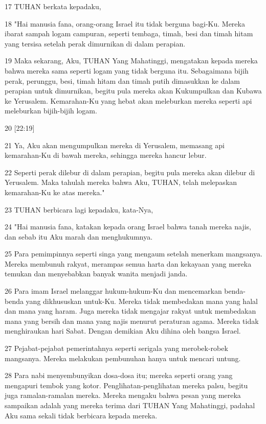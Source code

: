 \par 17 TUHAN berkata kepadaku,
\par 18 "Hai manusia fana, orang-orang Israel itu tidak berguna bagi-Ku. Mereka ibarat sampah logam campuran, seperti tembaga, timah, besi dan timah hitam yang tersisa setelah perak dimurnikan di dalam perapian.
\par 19 Maka sekarang, Aku, TUHAN Yang Mahatinggi, mengatakan kepada mereka bahwa mereka sama seperti logam yang tidak berguna itu. Sebagaimana bijih perak, perunggu, besi, timah hitam dan timah putih dimasukkan ke dalam perapian untuk dimurnikan, begitu pula mereka akan Kukumpulkan dan Kubawa ke Yerusalem. Kemarahan-Ku yang hebat akan meleburkan mereka seperti api meleburkan bijih-bijih logam.
\par 20 [22:19]
\par 21 Ya, Aku akan mengumpulkan mereka di Yerusalem, memasang api kemarahan-Ku di bawah mereka, sehingga mereka hancur lebur.
\par 22 Seperti perak dilebur di dalam perapian, begitu pula mereka akan dilebur di Yerusalem. Maka tahulah mereka bahwa Aku, TUHAN, telah melepaskan kemarahan-Ku ke atas mereka."
\par 23 TUHAN berbicara lagi kepadaku, kata-Nya,
\par 24 "Hai manusia fana, katakan kepada orang Israel bahwa tanah mereka najis, dan sebab itu Aku marah dan menghukumnya.
\par 25 Para pemimpinnya seperti singa yang mengaum setelah menerkam mangsanya. Mereka membunuh rakyat, merampas semua harta dan kekayaan yang mereka temukan dan menyebabkan banyak wanita menjadi janda.
\par 26 Para imam Israel melanggar hukum-hukum-Ku dan mencemarkan benda-benda yang dikhususkan untuk-Ku. Mereka tidak membedakan mana yang halal dan mana yang haram. Juga mereka tidak mengajar rakyat untuk membedakan mana yang bersih dan mana yang najis menurut peraturan agama. Mereka tidak menghiraukan hari Sabat. Dengan demikian Aku dihina oleh bangsa Israel.
\par 27 Pejabat-pejabat pemerintahnya seperti serigala yang merobek-robek mangsanya. Mereka melakukan pembunuhan hanya untuk mencari untung.
\par 28 Para nabi menyembunyikan dosa-dosa itu; mereka seperti orang yang mengapuri tembok yang kotor. Penglihatan-penglihatan mereka palsu, begitu juga ramalan-ramalan mereka. Mereka mengaku bahwa pesan yang mereka sampaikan adalah yang mereka terima dari TUHAN Yang Mahatinggi, padahal Aku sama sekali tidak berbicara kepada mereka.
